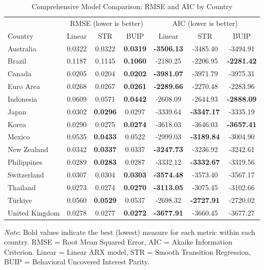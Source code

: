 
\begin{table}[htbp]
\centering
\caption{Comprehensive Model Comparison: RMSE and AIC by Country}
\label{tab:comprehensive_model_comparison}
\begin{tabular}{l|ccc|ccc}
\toprule
 & \multicolumn{3}{c|}{RMSE (lower is better)} & \multicolumn{3}{c}{AIC (lower is better)} \\
Country & Linear & STR & BUIP & Linear & STR & BUIP \\
\midrule
Australia            &     0.0322 &     0.0322 & \textbf{0.0319} & \textbf{-3506.13} &   -3485.40 &   -3494.91 \\
Brazil               &     0.1187 &     0.1145 & \textbf{0.1060} &   -2180.25 &   -2206.95 & \textbf{-2281.42} \\
Canada               &     0.0205 &     0.0204 & \textbf{0.0202} & \textbf{-3981.07} &   -3971.79 &   -3975.31 \\
Euro Area            &     0.0268 &     0.0267 & \textbf{0.0261} & \textbf{-2289.66} &   -2270.48 &   -2283.96 \\
Indonesia            &     0.0609 &     0.0571 & \textbf{0.0442} &   -2608.09 &   -2644.93 & \textbf{-2888.09} \\
Japan                &     0.0302 & \textbf{0.0296} &     0.0297 &   -3339.64 & \textbf{-3347.17} &   -3335.19 \\
Korea                &     0.0290 &     0.0275 & \textbf{0.0274} &   -3618.03 &   -3646.03 & \textbf{-3657.41} \\
Mexico               &     0.0535 & \textbf{0.0433} &     0.0522 &   -2999.03 & \textbf{-3189.84} &   -3004.90 \\
New Zealand          &     0.0342 & \textbf{0.0337} &     0.0337 & \textbf{-3247.73} &   -3236.92 &   -3242.61 \\
Philippines          &     0.0289 & \textbf{0.0283} &     0.0287 &   -3332.12 & \textbf{-3332.67} &   -3319.56 \\
Switzerland          &     0.0307 &     0.0304 & \textbf{0.0303} & \textbf{-3574.48} &   -3573.40 &   -3567.17 \\
Thailand             &     0.0273 &     0.0274 & \textbf{0.0270} & \textbf{-3113.05} &   -3075.45 &   -3102.66 \\
Türkiye              &     0.0560 & \textbf{0.0529} &     0.0537 &   -2698.32 & \textbf{-2727.91} &   -2720.02 \\
United Kingdom       &     0.0278 &     0.0277 & \textbf{0.0272} & \textbf{-3677.91} &   -3660.45 &   -3677.27 \\
\bottomrule
\end{tabular}
\begin{tablenotes}[para]
\small
\textit{Note}: Bold values indicate the best (lowest) measure for each metric within each country. RMSE = Root Mean Squared Error, AIC = Akaike Information Criterion. Linear = Linear ARX model, STR = Smooth Transition Regression, BUIP = Behavioral Uncovered Interest Parity.
\end{tablenotes}
\end{table}
